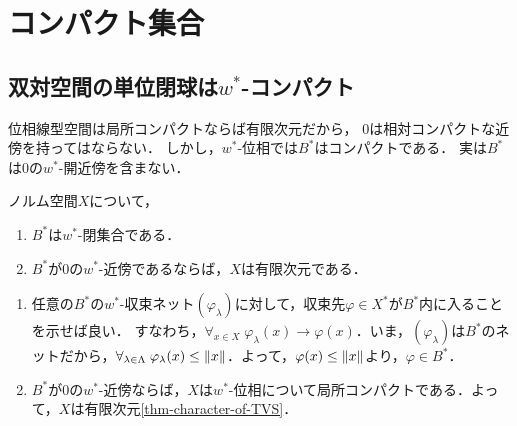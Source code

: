 \documentclass[uplatex,dvipdfmx]{jsreport}
\begin{document}
\section{コンパクト集合}



\subsection{双対空間の単位閉球は$w^*$-コンパクト}

\begin{tcolorbox}[colframe=ForestGreen, colback=ForestGreen!10!white,breakable,colbacktitle=ForestGreen!40!white,coltitle=black,fonttitle=\bfseries\sffamily,
title=双対理論を支えている消息]
    位相線型空間は局所コンパクトならば有限次元だから，
    $0$は相対コンパクトな近傍を持ってはならない．
    しかし，$w^*$-位相では$B^*$はコンパクトである．
    実は$B^*$は$0$の$w^*$-開近傍を含まない．
\end{tcolorbox}

\begin{lemma}
    ノルム空間$X$について，
    \begin{enumerate}
        \item $B^*$は$w^*$-閉集合である．
        \item $B^*$が$0$の$w^*$-近傍であるならば，$X$は有限次元である．
    \end{enumerate}
\end{lemma}
\begin{Proof}\mbox{}
    \begin{enumerate}
        \item 任意の$B^*$の$w^*$-収束ネット$(\varphi_\lambda)$に対して，収束先$\varphi\in X^*$が$B^*$内に入ることを示せば良い．
        すなわち，$\forall_{x\in X}\;\varphi_\lambda(x)\to\varphi(x)$．いま，$(\varphi_\lambda)$は$B^*$のネットだから，$\forall_{\lambda\in\Lambda}\;\varphi_\lambda(x)\le\|x\|$．よって，$\varphi(x)\le\|x\|$より，$\varphi\in B^*$．
        \item $B^*$が$0$の$w^*$-近傍ならば，$X$は$w^*$-位相について局所コンパクトである．よって，$X$は有限次元\ref{thm-character-of-TVS}．
    \end{enumerate}
\end{Proof}
\end{document}
